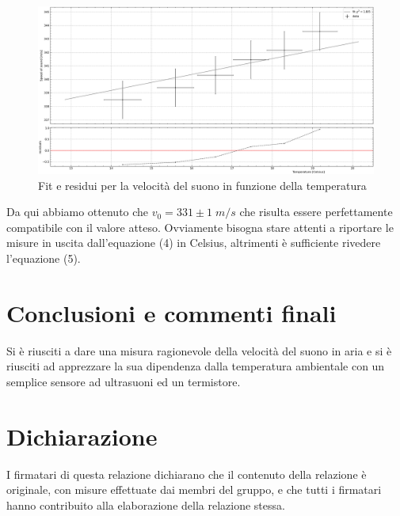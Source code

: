 \documentclass[10pt, a4paper, italian]{article}
\begin{document}
\begin{figure}[htbp]
    \centering
	\includegraphics[width=\textwidth]{Temperature}
    \caption{Fit e residui per la velocità del suono in funzione della temperatura}
\end{figure}
Da qui abbiamo ottenuto che $v_0 =331 \pm 1 \; m/s$ che risulta essere perfettamente compatibile con il valore atteso. Ovviamente bisogna stare attenti a riportare le misure in uscita dall'equazione (4) in Celsius, altrimenti è sufficiente rivedere l'equazione (5).
\section*{Conclusioni e commenti finali}
Si è riusciti a dare una misura ragionevole della velocità del suono in aria
e si è riusciti ad apprezzare la sua dipendenza dalla temperatura ambientale
con un semplice sensore ad ultrasuoni ed un termistore.

\section*{Dichiarazione}
I firmatari di questa relazione dichiarano che il contenuto della relazione \`e
originale, con misure effettuate dai membri del gruppo, e che tutti i firmatari
hanno contribuito alla elaborazione della relazione stessa.
\end{document}
